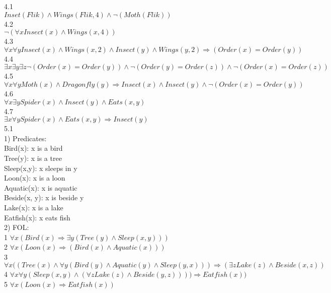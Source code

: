 \documentclass[a4paper]{article}
\begin{document}
4.1\\
$Inset(Flik) \wedge Wings(Flik, 4) \wedge \neg (Moth(Flik))$\\

4.2\\
$\neg(\forall x Insect(x) \wedge Wings(x, 4))$\\

4.3\\
$\forall x \forall y Insect(x)\wedge Wings(x,2) \wedge Insect(y) \wedge Wings(y, 2) \Rightarrow (Order(x) = Order(y))$\\

4.4\\
$\exists x \exists y \exists z \neg(Order(x) = Order(y)) \wedge \neg (Order(y) = Order(z)) \wedge \neg (Order(x) = Order(z))$\\

4.5\\
$\forall x \forall y Moth(x) \wedge Dragonfly(y) \Rightarrow Insect(x) \wedge Insect(y) \wedge \neg (Order(x) = Order(y))$\\

4.6\\
$\forall x \exists y Spider(x) \wedge Insect(y) \wedge Eats(x, y)$\\

4.7\\
$\exists x \forall y Spider(x) \wedge Eats(x, y) \Rightarrow Insect(y)$\\

5.1\\
1) Predicates:\\
Bird(x): x is a bird\\
Tree(y): x is a tree\\
Sleep(x,y): x sleeps in y\\
Loon(x): x is a loon\\
Aquatic(x): x is aquatic\\
Beside(x, y): x is beside y\\
Lake(x): x is a lake\\
Eatfish(x): x eats fish\\

2) FOL:\\
1 $\forall x (Bird(x) \Rightarrow \exists y (Tree(y) \wedge Sleep(x,y)))$\\
2 $\forall x (Loon(x) \Rightarrow (Bird(x) \wedge Aquatic(x)))$\\
3 $\forall x ((Tree(x) \wedge \forall y (Bird(y) \wedge Aquatic(y) \wedge Sleep(y,x)) ) \Rightarrow (\exists z Lake(z) \wedge Beside(x, z))$\\
4 $\forall x \forall y(Sleep(x,y) \wedge (\forall z Lake(z)\wedge Beside(y, z))) )\Rightarrow Eatfish(x))$\\
5 $\forall x (Loon(x) \Rightarrow Eatfish(x))$\\
\end{document}
